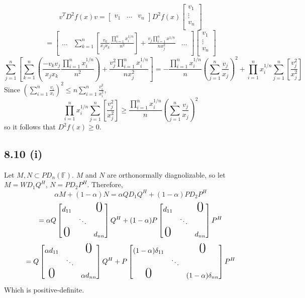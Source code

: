 \documentclass[letterpaper,12pt]{article}
\theoremstyle{definition}
\begin{document}
\[v^TD^2f(x)v=\begin{bmatrix}
v_1 &\dots &v_n\end{bmatrix} D^2f(x)
\begin{bmatrix}
v_1 \\
\vdots \\
v_n\\
\end{bmatrix}
\]
\[=\begin{bmatrix}
\dots &\sum_{k=1}^n[\frac{v_k}{x_jx_k}\frac{\prod_{i=1}^nx_i^{1/n}}{n^2}]+\frac{v_j\prod_{i=1}^nx^{1/n}}{nx_j^2} & \dots
\end{bmatrix}
\begin{bmatrix}
v_1 \\
\vdots \\
v_n\\
\end{bmatrix}
\]
\[\sum_{j=1}^n[\sum_{k=1}^n(\frac{-v_kv_j}{x_jx_k}\frac{\prod_{i=1}^nx_i^{1/n}}{n^2})+\frac{v_j^2\prod_{i=1}^nx_i^{1/n}}{nx_j^2}]=-\frac{\prod_{i=1}^nx_i^{1/n}}{n}(\sum_{j=1}^n\frac{v_j}{x_j})^2+\prod_{i=1}^nx_i^{1/n}\sum_{j=1}^n[\frac{v_j^2}{x_j^2}]\]
Since $(\sum_{i=1}^n\frac{v_i}{x_i})^2 \le n\sum_{i=1}^n\frac{v_i^2}{x_i^2}$, \[\prod_{i=1}^nx_i^{1/n}\sum_{j=1}^n[\frac{v_j^2}{x_j^2}] \ge \frac{\prod_{i=1}^nx_i^{1/n}}{n}(\sum_{j=1}^n\frac{v_j}{x_j})^2\]
so it follows that $D^2f(x) \ge 0$.

\subsection*{8.10 (i)}
Let $M,N \subset PD_n(\mathbb{F})$. $M$ and $N$ are orthonormally diagnolizable, so let $M=WD_1Q^H$, $N=PD_2P^H$. Therefore,
\[\alpha M +(1-\alpha)N=\alpha QD_1Q^H +(1-\alpha)PD_2P^H\]
\[=\alpha Q \begin{bmatrix}
d_{11}&& \text{\huge{0}} \\
 & \ddots &\\
\text{\huge{0}} && d_{nn} \end{bmatrix}Q^H+(1-\alpha)P\begin{bmatrix}
d_{11}&& \text{\huge{0}} \\
 & \ddots &\\
\text{\huge{0}} && d_{nn} \end{bmatrix}P^H\]
\[=Q \begin{bmatrix}
\alpha d_{11}&& \text{\huge{0}} \\
 & \ddots &\\
\text{\huge{0}} && \alpha d_{nn} \end{bmatrix}Q^H+P\begin{bmatrix}
(1-\alpha)\delta_{11}&& \text{\huge{0}} \\
 & \ddots &\\
\text{\huge{0}} && (1-\alpha)\delta_{nn} \end{bmatrix}P^H\]
Which is positive-definite.\\
\end{document}
